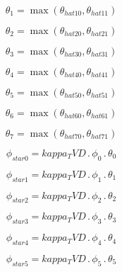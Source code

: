 \documentclass{article}
\begin{document}
\begin{dmath}\theta_{1} = \max\left(\theta_{hat 10}, \theta_{hat 11}\right)\end{dmath}

\begin{dmath}\theta_{2} = \max\left(\theta_{hat 20}, \theta_{hat 21}\right)\end{dmath}

\begin{dmath}\theta_{3} = \max\left(\theta_{hat 30}, \theta_{hat 31}\right)\end{dmath}

\begin{dmath}\theta_{4} = \max\left(\theta_{hat 40}, \theta_{hat 41}\right)\end{dmath}

\begin{dmath}\theta_{5} = \max\left(\theta_{hat 50}, \theta_{hat 51}\right)\end{dmath}

\begin{dmath}\theta_{6} = \max\left(\theta_{hat 60}, \theta_{hat 61}\right)\end{dmath}

\begin{dmath}\theta_{7} = \max\left(\theta_{hat 70}, \theta_{hat 71}\right)\end{dmath}

\begin{dmath}\phi_{star 0} = kappa_TVD \,.\, \phi_{0} \,.\, \theta_{0}\end{dmath}

\begin{dmath}\phi_{star 1} = kappa_TVD \,.\, \phi_{1} \,.\, \theta_{1}\end{dmath}

\begin{dmath}\phi_{star 2} = kappa_TVD \,.\, \phi_{2} \,.\, \theta_{2}\end{dmath}

\begin{dmath}\phi_{star 3} = kappa_TVD \,.\, \phi_{3} \,.\, \theta_{3}\end{dmath}

\begin{dmath}\phi_{star 4} = kappa_TVD \,.\, \phi_{4} \,.\, \theta_{4}\end{dmath}

\begin{dmath}\phi_{star 5} = kappa_TVD \,.\, \phi_{5} \,.\, \theta_{5}\end{dmath}
\end{document}
